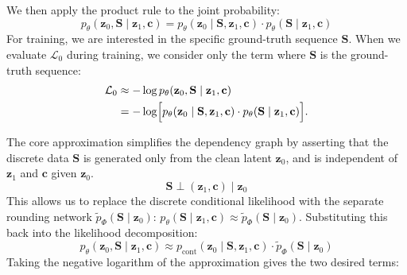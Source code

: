 We then apply the product rule to the joint probability:
\begin{equation}
    p_\theta(\mathbf{z}_0, \mathbf{S} \mid \mathbf{z}_1, \mathbf{c}) = p_\theta(\mathbf{z}_0 \mid \mathbf{S}, \mathbf{z}_1, \mathbf{c}) \cdot p_\theta(\mathbf{S} \mid \mathbf{z}_1, \mathbf{c})
\end{equation}
For training, we are interested in the specific ground-truth sequence $\mathbf{S}$. When we evaluate $\mathcal{L}_0$ during training, we consider only the term where $\mathbf{S}$ is the ground-truth sequence:
\begin{equation}
\begin{aligned}
\mathcal{L}_0
&\approx -\log p_\theta(\mathbf{z}_0, \mathbf{S} \mid \mathbf{z}_1, \mathbf{c}) \\
&= -\log \Bigl[
    p_\theta(\mathbf{z}_0 \mid \mathbf{S}, \mathbf{z}_1, \mathbf{c})
    \cdot
    p_\theta(\mathbf{S} \mid \mathbf{z}_1, \mathbf{c})
\Bigr].
\end{aligned}
\end{equation}

\noindent The core approximation simplifies the dependency graph by asserting that the discrete data $\mathbf{S}$ is generated only from the clean latent $\mathbf{z}_0$, and is independent of $\mathbf{z}_1$ and $\mathbf{c}$ given $\mathbf{z}_0$.
\begin{equation}
    \mathbf{S} \perp (\mathbf{z}_1, \mathbf{c}) \mid \mathbf{z}_0
\end{equation}
This allows us to replace the discrete conditional likelihood with the separate rounding network $\tilde{p}_\Phi(\mathbf{S} \mid \mathbf{z}_0)$:
$p_\theta(\mathbf{S} \mid \mathbf{z}_1, \mathbf{c}) \approx \tilde{p}_\Phi(\mathbf{S} \mid \mathbf{z}_0)$.
Substituting this back into the likelihood decomposition:
\begin{equation}
    p_\theta(\mathbf{z}_0, \mathbf{S} \mid \mathbf{z}_1, \mathbf{c}) \approx p_{\mathrm{cont}}(\mathbf{z}_0 \mid \mathbf{S}, \mathbf{z}_1, \mathbf{c}) \cdot \tilde{p}_\Phi(\mathbf{S} \mid \mathbf{z}_0)
\end{equation}
Taking the negative logarithm of the approximation gives the two desired terms:

